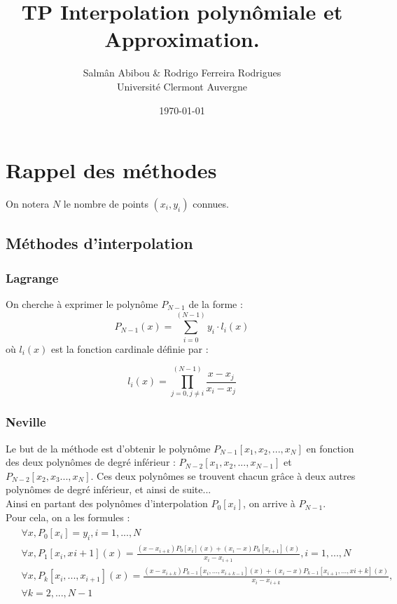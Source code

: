 \documentclass[12pt,french,titlepage]{article}
\title{TP Interpolation polynômiale et Approximation.}
\author{Salmân Abibou \& Rodrigo Ferreira Rodrigues \\
Université Clermont Auvergne\\}
\date{\today}
\begin{document}
	\maketitle


	\tableofcontents
	\newpage
	
	\section{Rappel des méthodes}
	On notera $N$ le nombre de points $(x_i,y_i)$ connues.
	\subsection{Méthodes d'interpolation}
	
	\subsubsection{Lagrange}

	On cherche à exprimer le polynôme $P_{N-1}$ de la forme :
	\begin{equation}
	P_{N-1}(x) = \sum_{i=0}^{(N-1)}y_i\cdot l_i(x) \label{lagrange}
	\end{equation}
	où $l_i(x)$ est la fonction cardinale définie par :
	
	\begin{equation}
	l_i(x) = \prod_{j=0,j\neq i}^{(N-1)}\frac{x - x_j}{x_i - x_j} \label{cardinale}
	\end{equation}
	
	\subsubsection{Neville}
	\label{nev}
	Le but de la méthode est d'obtenir le polynôme $P_{N-1}[x_1,x_2,... ,x_N]$ en fonction des deux polynômes de degré inférieur : $P_{N-2}[x_1,x_2,... ,x_{N-1}]$ et $P_{N-2}[x_2,x_3... ,x_{N}]$. Ces deux polynômes se trouvent chacun grâce à deux autres polynômes de degré inférieur, et ainsi de suite...\\
	Ainsi en partant des polynômes d'interpolation $P_0[x_i]$, on arrive à $P_{N-1}$.\\
	Pour cela, on a les formules :\\
	\begin{align}
		\begin{split}
	&\forall x,P_0[x_i]=y_i,i=1,...,N\\
	&\forall x,P_1[x_i,x_{}i+1](x)=\frac{(x-x_{i+k})P_{0}[x_i](x)+(x_i-x)P_{0}[x_{i+1}](x)}{x_i-x_{i+1}},i=1,...,N\\
	&\forall x,P_k[x_i,...,x_{i+1}](x)=\frac{(x-x_{i+k})P_{k-1}[x_i,...,x_{i+k-1}](x)+(x_i-x)P_{k-1}[x_{i+1},...,x{i+k}](x)}{x_i-x_{i+k}},\\ \label{neville}
	&\forall k=2,...,N-1
		\end{split}
	\end{align}
	
\end{document}
